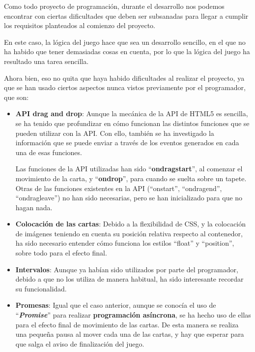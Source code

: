 \documentclass{\ClassPath/viu-tfm-template}
\begin{document}
Como todo proyecto de programación, durante el desarrollo nos podemos encontrar con ciertas dificultades que deben ser subsanadas para llegar a cumplir los requisitos planteados al comienzo del proyecto.

En este caso, la lógica del juego hace que sea un desarrollo sencillo, en el que no ha habido que tener demasiadas cosas en cuenta, por lo que la lógica del juego ha resultado una tarea sencilla.

Ahora bien, eso no quita que haya habido dificultades al realizar el proyecto, ya que se han usado ciertos aspectos nunca vistos previamente por el programador, que son:

\begin{itemize}
    \item \textbf{API drag and drop}: Aunque la mecánica de la API de HTML5 es sencilla, se ha tenido que profundizar en cómo funcionan las distintos funciones que se pueden utilizar con la API. Con ello, también se ha investigado la información que se puede enviar a través de los eventos generados en cada una de esas funciones.

    Las funciones de la API utilizadas han sido “\textbf{ondragstart}”, al comenzar el movimiento de la carta, y “\textbf{ondrop}”, para cuando se suelta sobre un tapete. Otras de las funciones existentes en la API (“onstart”, “ondragend”, “ondragleave”) no han sido necesarias, pero se han inicializado para que no hagan nada.

    \item \textbf{Colocación de las cartas}: Debido a la flexibilidad de CSS, y la colocación de imágenes teniendo en cuenta su posición relativa respecto al contenedor, ha sido necesario entender cómo funciona los estilos “float” y “position”, sobre todo para el efecto final.

    \item \textbf{Intervalos}: Aunque ya habían sido utilizados por parte del programador, debido a que no los utiliza de manera habitual, ha sido interesante recordar su funcionalidad.

    \item \textbf{Promesas}: Igual que el caso anterior, aunque se conocía el uso de “\textit{\textbf{Promise}}” para realizar \textbf{programación asíncrona}, se ha hecho uso de ellas para el efecto final de movimiento de las cartas. De esta manera se realiza una pequeña pausa al mover cada una de las cartas, y hay que esperar para que salga el aviso de finalización del juego.
\end{itemize}
\end{document}
